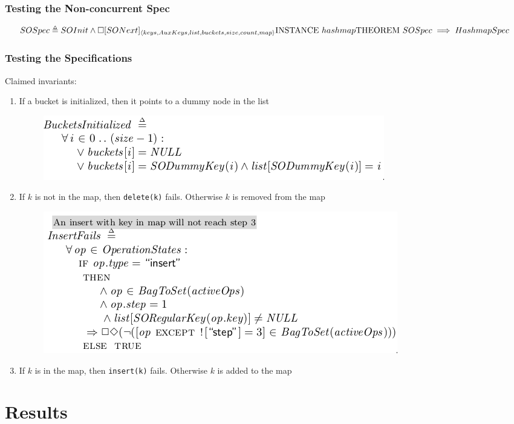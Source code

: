 \documentclass{beamer}
\begin{document}
\begin{frame}
  \frametitle{Testing the Non-concurrent Spec}
  \[ SOSpec \triangleq SOInit \land \square [SONext]_{\langle {keys, AuxKeys,
        list, buckets, size, count, map} \rangle}
    \\
    \text{INSTANCE } hashmap
    \\
    \text{THEOREM } SOSpec \implies HashmapSpec \]

\end{frame}
\begin{frame}[allowframebreaks]
  \frametitle{Testing the Specifications}
  Claimed invariants:
  \begin{enumerate}
  \item If a bucket is initialized, then it points to a dummy node in the list
    \begin{figure}
    \includegraphics[width=.8\textwidth]{figures/bucketsinitialized}
    \end{figure}
  \item If $k$ is not in the map, then \texttt{delete(k)} fails. Otherwise $k$ is
    removed from the map
    \begin{figure}[h]
    \includegraphics[width=.8\textwidth]{figures/insertfails}
    \end{figure}
  \item If $k$ is in the map, then \texttt{insert(k)} fails. Otherwise $k$ is
    added to the map
  \end{enumerate}
\end{frame}

\section{Results}
\end{document}
